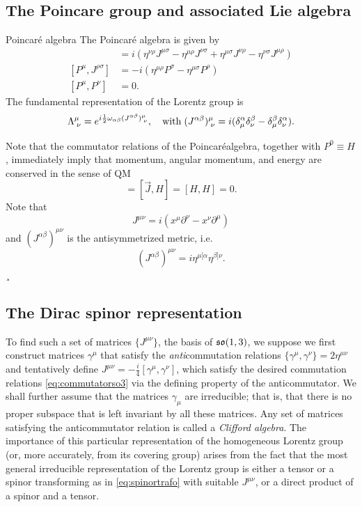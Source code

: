   \subsection{The Poincare group and associated Lie algebra}
  \begin{mybox}{Poincaré algebra}
  	The Poincaré algebra is given by
  	\begin{align}
  		[J^{\mu \nu} , J^{\rho \sigma}] &= i \left( \eta^{\nu \rho} J^{\mu \sigma} - \eta^{\mu\rho} J^{\nu\sigma} +\eta^{\mu \sigma} J^{\nu\rho} -\eta^{\nu\sigma} J^{\mu\rho} \right)\\
  		[P^\mu,J^{ \rho \sigma}]&= -i \left(\eta^{\mu \rho} P^\sigma - \eta^{\mu \sigma} P^\rho\right)\\
  		[P^\mu,P^\nu]&=0.
  	\end{align}
  The fundamental representation of the Lorentz group is
  \begin{equation}
  	\Lambda^\mu_{\;\nu} =e^{i \frac{1}{2} \omega_{\alpha \beta} (J^{\alpha \beta})^\mu_{\;\nu}}, \quad \mathrm{with}\; (J^{\alpha \beta})^\mu_{\;\nu} = i (\delta^\alpha_\mu \delta^\beta_\nu -\delta^\beta_\mu \delta^\alpha_\nu ).
  \end{equation}
  \end{mybox}
  Note that the commutator relations of the Poincaréalgebra, together with $P^0 ≡ H$, immediately
  imply that momentum, angular momentum, and energy are conserved in the sense of QM
  \begin{equation}
  	[\vec{P},H]=[\vec{J},H] = [H,H] =0.
  \end{equation}
  Note that 
  \begin{equation}
  	J^{\mu\nu}= i(x^\mu \partial^\nu - x^\nu \partial^\mu )
  \end{equation}
  and $(J^{\alpha \beta} )^{\mu\nu}$ is the antisymmetrized metric, i.e.
  \begin{equation}
  (J^{\alpha \beta})^{\mu \nu} = i \eta^{\mu [\alpha}\eta^{\beta]\nu}.
  \end{equation}
¸\subsection{The Dirac spinor representation}
To find such a set of matrices $\{J^{\mu\nu}\}$, the basis of $\mathfrak{so}(1,3)$, we suppose we first construct matrices $\gamma^\mu$ that satisfy the \emph{anti}commutation relations $\{\gamma^\mu, \gamma^\nu \} = 2 \eta^{\mu \nu}$ and tentatively define $J^{\mu \nu} = - \frac{i}{4} [\gamma^\mu,\gamma^\nu]$, which satisfy the desired commutation relations \ref{eq:commutatorso3} via the defining property of the anticommutator. We shall further assume that the matrices $\gamma_\mu$ are irreducible; that is, that there is no proper subspace that is left invariant by all these matrices. Any set of matrices satisfying the anticommutator relation is called a \emph{Clifford algebra}. The importance of this particular representation of the homogeneous Lorentz group (or, more accurately, from its covering group) arises from the fact that the most general irreducible representation of the Lorentz group is either a tensor or a spinor transforming as in \ref{eq:spinortrafo} with suitable $J^{\mu\nu}$, or a direct product of a spinor and a tensor.




